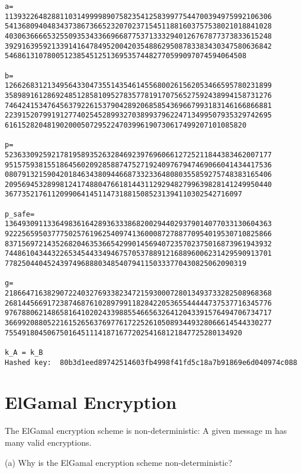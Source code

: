 \documentclass{article}
\begin{document}
\begin{framed}
\begin{lstlisting}
a=  
113932264828811031499998907582354125839977544700394975992106306
541368094048343738673665232070237154511881603757538021018841028
403063666653255093534336696687753713332940126767877373833615248
392916395921339141647849520042035488629508783383430347580636842
546861310780051238545125136953574482770599097074594064508 

b=  
126626831213495643304735514354614556800261562053466595780231899
358989161286924851285810952783577819170756527592438994158731276
746424153476456379226153790428920685854369667993183146166866881
223915207991912774025452899327038993796224713499507935329742695
616152820481902000507295224703996190730617499207101085820 

p=  
523633092592178195893526328469239769606612725211844383462007177
951575938155186456020928588747527192409767947469066041434417536
080791321590420184634380944668733233648080355859275748383165406
209569453289981241748804766181443112929482799639828141249950440
36773521761120990641451147318815085231394110302542716097 

p_safe=  
136493091133649836164289363338682002944029379014077033130604363
922256595037775025761962540974136000872788770954019530710825866
837156972143526820463536654299014569407235702375016873961943932
744861043443226534544334946757053788912168896006231429590913701
778250440452439749688803485407941150333770430825062090319 

g=  
218664716382907224032769338234721593000728013493733282508968368
268144566917238746876102897991182842205365544444737537716345776
976788062148658164102024339885546656326412043391576494706734717
366992088052216152656376977617225261050893449328066614544330277
75549180450675016451114187167720254168121847725280134920 

k_A = k_B
Hashed key:  80b3d1eed89742514603fb4998f41fd5c18a7b91869e6d040974c088
\end{lstlisting}
\end{framed}

\section{ElGamal Encryption}
The ElGamal encryption scheme is non-deterministic: A given message m has many valid encryptions.

(a) Why is the ElGamal encryption scheme non-deterministic?\\
\end{document}
